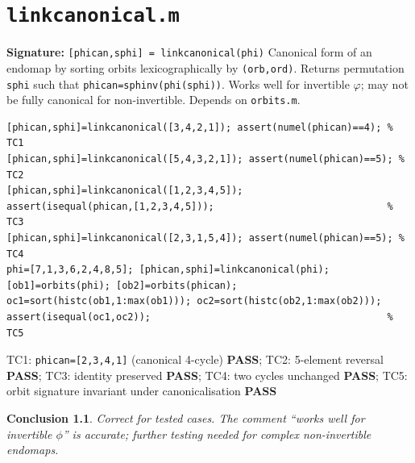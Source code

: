 \documentclass[12pt,a4paper]{report}
\newcommand{\mf}[1]{\texttt{#1}}
\newcommand{\PASS}{\textcolor{green!60!black}{\textbf{PASS}}}
\newtheorem{concl}{Conclusion}[chapter]
\begin{document}
\chapter{\mf{linkcanonical.m}}
\begin{tcolorbox}[Abox,title=Analysis]
\textbf{Signature:} \lstinline|[phican,sphi] = linkcanonical(phi)|\quad
Canonical form of an endomap by sorting orbits lexicographically by \texttt{(orb,ord)}. Returns permutation \mf{sphi} such that \mf{phican=sphinv(phi(sphi))}. Works well for invertible $\varphi$; may not be fully canonical for non-invertible. Depends on \mf{orbits.m}.
\end{tcolorbox}
\begin{lstlisting}[caption={Tests for linkcanonical.m}]
[phican,sphi]=linkcanonical([3,4,2,1]); assert(numel(phican)==4); % TC1
[phican,sphi]=linkcanonical([5,4,3,2,1]); assert(numel(phican)==5); % TC2
[phican,sphi]=linkcanonical([1,2,3,4,5]);
assert(isequal(phican,[1,2,3,4,5]));                              % TC3
[phican,sphi]=linkcanonical([2,3,1,5,4]); assert(numel(phican)==5); % TC4
phi=[7,1,3,6,2,4,8,5]; [phican,sphi]=linkcanonical(phi);
[ob1]=orbits(phi); [ob2]=orbits(phican);
oc1=sort(histc(ob1,1:max(ob1))); oc2=sort(histc(ob2,1:max(ob2)));
assert(isequal(oc1,oc2));                                         % TC5
\end{lstlisting}
\begin{tcolorbox}[Pbox,title=TC1--TC5 -- All pass]
TC1: \texttt{phican=[2,3,4,1]} (canonical 4-cycle) \PASS; TC2: 5-element reversal \PASS; TC3: identity preserved \PASS; TC4: two cycles unchanged \PASS; TC5: orbit signature invariant under canonicalisation \PASS
\end{tcolorbox}
\begin{concl}
Correct for tested cases. The comment ``works well for invertible $\phi$'' is accurate; further testing needed for complex non-invertible endomaps.
\end{concl}

\end{document}
